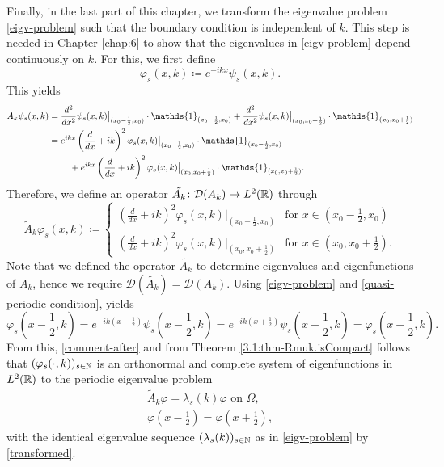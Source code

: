 Finally, in the last part of this chapter, we transform the eigenvalue problem \eqref{eigv-problem} such that the boundary condition is independent of $k$. This step is needed in Chapter \ref{chap:6} to show that the eigenvalues in \eqref{eigv-problem} depend continuously on $k$. For this, we first define
	\[ \varphi_{s}(x, k) \coloneqq e^{-ikx} \psi_{s}(x, k). \]
This yields
	\begin{align}
		A_{k} \psi_{s}(x, k) & = \frac{d^{2}}{dx^{2}} \psi_{s}(x, k)\big|_{(x_{0} - \frac{1}{2}, x_{0})} \cdot \mathds{1}_{(x_{0} - \frac{1}{2}, x_{0})} + \frac{d^{2}}{dx^{2}} \psi_{s}(x, k)\big|_{(x_{0}, x_{0}  + \frac{1}{2})} \cdot \mathds{1}_{(x_{0}, x_{0} + \frac{1}{2})} \notag \\
			& = e^{ikx} \left( \frac{d}{dx} + ik \right)^{2} \varphi_{s}(x, k)\big|_{(x_{0} - \frac{1}{2}, x_{0})} \cdot \mathds{1}_{(x_{0} - \frac{1}{2}, x_{0})} \notag \\
			& ~\qquad + e^{ikx} \left( \frac{d}{dx} + ik \right)^{2} \varphi_{s}(x, k)\big|_{(x_{0}, x_{0}  + \frac{1}{2})} \cdot \mathds{1}_{(x_{0}, x_{0} + \frac{1}{2})}. \label{transformed}
	\end{align}
Therefore, we define an operator $\tilde{A_{k}} \colon \mathcal{D}(A_{k}) \rightarrow L^{2}(\mathbb{R})$ through
	\[ \tilde{A}_{k} \varphi_{s}(x, k) \coloneqq \begin{cases}
		\left( \frac{d}{dx} + ik \right)^{2} \varphi_{s}(x, k)|_{(x_{0} - \frac{1}{2}, x_{0})} & \text{for } x \in (x_{0} - \frac{1}{2}, x_{0}) \\ \left( \frac{d}{dx} + ik \right)^{2} \varphi_{s}(x, k)|_{(x_{0}, x_{0}  + \frac{1}{2})} & \text{for } x \in (x_{0}, x_{0} + \frac{1}{2}).
	\end{cases} \] 
Note that we defined the operator $\tilde{A_{k}}$ to determine eigenvalues and eigenfunctions of $A_{k}$, hence we require $\mathcal{D}(\tilde{A_{k}}) = \mathcal{D}(A_{k})$. Using \eqref{eigv-problem} and \eqref{quasi-periodic-condition}, yields 
	\[ \varphi_{s}\left(x - \frac{1}{2}, k\right) = e^{-ik(x - \frac{1}{2})} \psi_{s}\left(x - \frac{1}{2}, k\right) = e^{-ik(x + \frac{1}{2})} \psi_{s}\left(x + \frac{1}{2}, k\right) = \varphi_{s}\left(x + \frac{1}{2}, k\right). \]
From this, \eqref{comment-after} and from Theorem \ref{3.1:thm-Rmuk.isCompact} follows that $(\varphi_{s}(\cdot, k))_{s \in \mathbb{N}}$ is an orthonormal and complete system of eigenfunctions in $L^{2}(\mathbb{R})$ to the periodic eigenvalue problem
	\begin{align}
		\tilde{A}_{k} \varphi = \lambda_{s}(k) \varphi \text{ on } \Omega, \label{mod-eigv-problem} \\
		\varphi\left(x - \frac{1}{2}\right) = \varphi\left(x + \frac{1}{2}\right), \label{periodic-condition}
	\end{align}
with the identical eigenvalue sequence $(\lambda_{s}(k))_{s \in \mathbb{N}}$ as in \eqref{eigv-problem} by \eqref{transformed}.